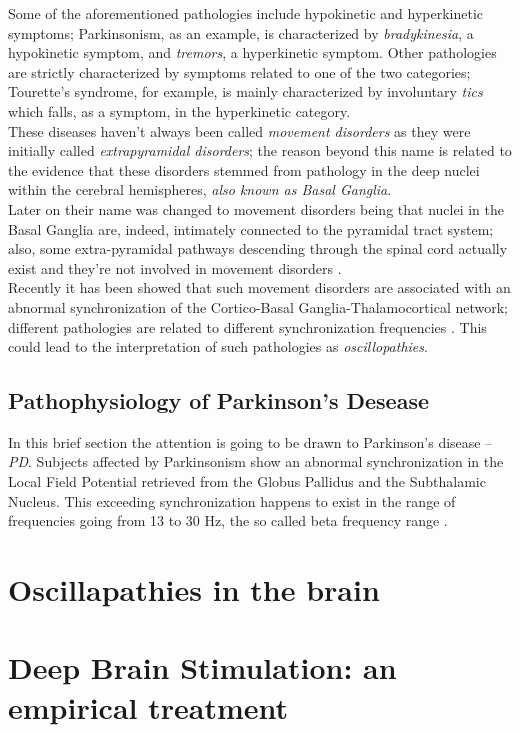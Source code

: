 \documentclass[MSc,english]{Container/thesistemplate}
\begin{document}
Some of the aforementioned pathologies include hypokinetic and hyperkinetic symptoms; Parkinsonism, as an example, is characterized by \emph{bradykinesia}, a hypokinetic symptom, and \emph{tremors}, a hyperkinetic symptom. Other pathologies are strictly characterized by symptoms related to one of the two categories; Tourette's syndrome, for example, is mainly characterized by involuntary \emph{tics} which falls, as a symptom, in the hyperkinetic category.\\
These diseases haven't always been called \emph{movement disorders} as they were initially called \emph{extrapyramidal disorders}; the reason beyond this name is related to the evidence that these disorders stemmed from pathology in the deep nuclei within the cerebral hemispheres, \emph{also known as Basal Ganglia}. 
\\Later on their name was changed to movement disorders being that nuclei in the Basal Ganglia are, indeed, intimately connected to the pyramidal tract system; also, some extra-pyramidal pathways descending through the spinal cord  actually exist and they're not involved in movement disorders \cite{fahn}.\\
Recently it has been showed that such movement disorders are associated with an abnormal synchronization of the Cortico-Basal Ganglia-Thalamocortical network; different pathologies are related to different synchronization frequencies \cite{vissani}. This could lead to the interpretation of such pathologies as \emph{oscillopathies}.

\subsection{Pathophysiology of Parkinson's Desease}
In this brief section the attention is going to be drawn to Parkinson's disease -- \emph{PD}. Subjects affected by Parkinsonism show an abnormal synchronization in the Local Field Potential retrieved from the Globus Pallidus and the Subthalamic Nucleus. This exceeding synchronization happens to exist in the range of frequencies going from 13 to 30 Hz, the so called beta frequency range \cite{vissani}.

\newpage
\section{Oscillapathies in the brain}

\newpage
\section{Deep Brain Stimulation: an empirical treatment}
\end{document}

